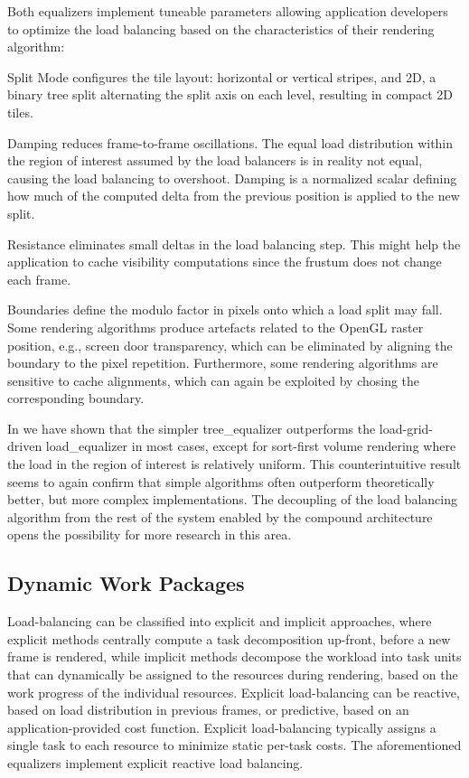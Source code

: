 Both equalizers implement tuneable parameters allowing application developers to
optimize the load balancing based on the characteristics of their rendering
algorithm:

\begin{compactdesc}
\item[Split Mode] configures the tile layout: horizontal or vertical stripes,
and 2D, a binary tree split alternating the split axis on each level, resulting
in compact 2D tiles.
\item[Damping] reduces frame-to-frame oscillations. The equal load distribution
within the region of interest assumed by the load balancers is in reality not
equal, causing the load balancing to overshoot. Damping is a normalized scalar
defining how much of the computed delta from the previous position is applied to
the new split.
\item[Resistance] eliminates small deltas in the load balancing step. This might
help the application to cache visibility computations since the frustum does not
change each frame.
\item[Boundaries] define the modulo factor in pixels onto which a load split may
fall. Some rendering algorithms produce artefacts related to the OpenGL raster
position, e.g., screen door transparency, which can be eliminated by aligning
the boundary to the pixel repetition. Furthermore, some rendering algorithms are
sensitive to cache alignments, which can again be exploited by chosing the
corresponding boundary.
\end{compactdesc}

In \cite{ESP:18} we have shown that the simpler \textsf{tree\_equalizer}
outperforms the load-grid-driven \textsf{load\_equalizer} in most cases, except
for sort-first volume rendering where the load in the region of interest is
relatively uniform. This counterintuitive result seems to again confirm that
simple algorithms often outperform theoretically better, but more complex
implementations. The decoupling of the load balancing algorithm from the rest of
the system enabled by the compound architecture opens the possibility for more
research in this area.

\subsection{Dynamic Work Packages}

Load-balancing can be classified into explicit and implicit approaches, where
explicit methods centrally compute a task decomposition up-front, before a new
frame is rendered, while implicit methods decompose the workload into task units
that can dynamically be assigned to the resources during rendering, based on the
work progress of the individual resources. Explicit load-balancing can be
reactive, based on load distribution in previous frames, or predictive, based on
an application-provided cost function. Explicit load-balancing typically assigns
a single task to each resource to minimize static per-task costs.  The
aforementioned equalizers implement explicit reactive load balancing.

